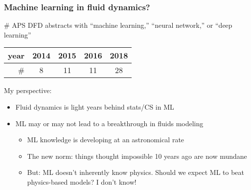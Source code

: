 \begin{frame}
    \frametitle{Machine learning in fluid dynamics?}
    \# APS DFD abstracts with ``machine learning,'' ``neural network,'' or ``deep learning''

    \begin{center}
        \begin{tabular}{r|cccc}
            year & 2014 & 2015 & 2016 & 2018 \\
            \hline
            \# & 8 & 11 & 11 & \alert{28}
        \end{tabular}
    \end{center}
    \pause

    My perspective:

    \begin{itemize}
        \item Fluid dynamics is light years behind stats/CS in ML
        \item ML may or may not lead to a breakthrough in fluids modeling
        \begin{itemize}
            \item ML knowledge is developing at an astronomical rate
            \item The new norm: things thought impossible 10 years ago are now mundane
            \item But: ML doesn't inherently know physics.
            Should we expect ML to beat physics-based models?
            I don't know!
        \end{itemize}
    \end{itemize}
\end{frame}

